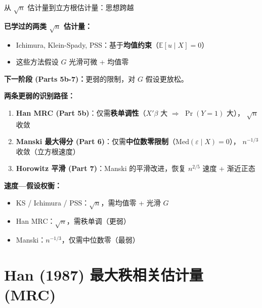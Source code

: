 \documentclass[aspectratio=169, 10pt]{beamer}
\begin{document}
\begin{frame}{从 $\sqrt{n}$ 估计量到立方根估计量：思想跨越}

  \textbf{已学过的两类 $\sqrt{n}$ 估计量：}
  \begin{itemize}\setlength{\itemsep}{1pt}
    \item Ichimura, Klein-Spady, PSS：基于\textbf{均值约束}（$\mathbb{E}[u\mid X] = 0$）
    \item 这些方法假设 $G$ 光滑可微 + 均值零
  \end{itemize}

  \textbf{下一阶段 (Parts 5b-7)：}更弱的限制，对 $G$ 假设更放松。

  \begin{highlightbox}
    \textbf{两条更弱的识别路径：}
    \begin{enumerate}\setlength{\itemsep}{1pt}
      \item \textbf{Han MRC (Part 5b)}：仅需\textbf{秩单调性}（$X'\beta$ 大 $\Rightarrow$ $\Pr(Y=1)$ 大），
      $\sqrt{n}$ 收敛
      \item \textbf{Manski 最大得分 (Part 6)}：仅需\textbf{中位数零限制}（$\text{Med}(\varepsilon \mid X) = 0$），
      $n^{-1/3}$ 收敛（立方根速度）
      \item \textbf{Horowitz 平滑 (Part 7)}：Manski 的平滑改进，恢复 $n^{2/5}$ 速度 + 渐近正态
    \end{enumerate}
  \end{highlightbox}

  \begin{keybox}
    \textbf{速度—假设权衡：}
    \begin{itemize}\setlength{\itemsep}{1pt}
      \item KS / Ichimura / PSS：$\sqrt{n}$，需均值零 + 光滑 $G$
      \item Han MRC：$\sqrt{n}$，需秩单调（更弱）
      \item Manski：$n^{-1/3}$，仅需中位数零（最弱）
    \end{itemize}
  \end{keybox}

\end{frame}

\section{Han (1987) 最大秩相关估计量 (MRC)}
\end{document}
